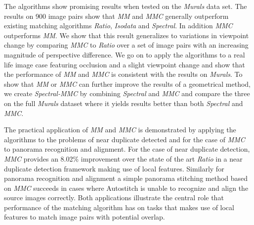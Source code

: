 \documentclass{article}
\begin{document}
The algorithms show promising results when tested on the \emph{Murals} 
data set. The results on 900 image pairs show that \emph{MM} and 
\emph{MMC} generally outperform existing matching algorithms 
\emph{Ratio}, \emph{Isodata} and \emph{Spectral}. In addition \emph{MMC} 
outperforms \emph{MM}.  We show that this result generalizes to 
variations in viewpoint change by comparing \emph{MMC} to \emph{Ratio} 
over a set of image pairs with an increasing magnitude of perspective 
difference. We go on to apply the algorithms to a real life image case 
featuring occlusion and a slight viewpoint change and show that the 
performance of \emph{MM} and \emph{MMC} is consistent with the results 
on \emph{Murals}. To show that \emph{MM} or \emph{MMC}
can further improve the results of a geometrical method, we create 
\emph{Spectral-MMC} by combining \emph{Spectral} and \emph{MMC} and 
compare the three on the full \emph{Murals} dataset where it yields 
results better than both \emph{Spectral} and \emph{MMC}.

The practical application of \emph{MM} and \emph{MMC} is demonstrated by 
applying the algorithms to the problems of near duplicate detected and 
for the case of \emph{MMC} to panorama recognition and alignment. For 
the case of near duplicate detection, \emph{MMC} provides an 8.02\% 
improvement over the state of the art \emph{Ratio} in a near duplicate 
detection framework making use of local features. Similarly for panorama 
recognition and alignment a simple panorama stitching method based on 
\emph{MMC} succeeds in cases where Autostitch is unable to recognize and 
align the source images correctly. Both applications illustrate the 
central role that performance of the matching algorithm has on tasks 
that makes use of local features to match image pairs with potential 
overlap.
%



\end{document}
